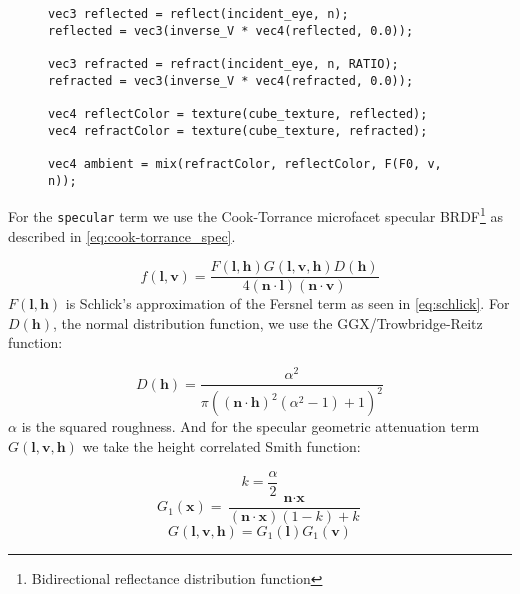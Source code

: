 \begin{figure}[ht!]
\begin{lstlisting}
vec3 reflected = reflect(incident_eye, n);
reflected = vec3(inverse_V * vec4(reflected, 0.0));

vec3 refracted = refract(incident_eye, n, RATIO);
refracted = vec3(inverse_V * vec4(refracted, 0.0));

vec4 reflectColor = texture(cube_texture, reflected);
vec4 refractColor = texture(cube_texture, refracted);

vec4 ambient = mix(refractColor, reflectColor, F(F0, v, n));
\end{lstlisting}
\end{figure}

For the \texttt{specular} term we use the Cook-Torrance microfacet specular
BRDF\footnote{Bidirectional reflectance distribution function} as
described in \autoref{eq:cook-torrance_spec}.

\begin{equation}\label{eq:cook-torrance_spec}
    f(\textbf{l}, \textbf{v}) ={} \frac{F(\textbf{l}, \textbf{h})
        G(\textbf{l}, \textbf{v}, \textbf{h}) D(\textbf{h})}{4
    (\textbf{n} \cdot \textbf{l}) (\textbf{n} \cdot \textbf{v})}
\end{equation}
%
$F(\textbf{l}, \textbf{h})$ is Schlick's approximation of the Fersnel term as
seen in \autoref{eq:schlick}. For $D(\textbf{h})$, the normal distribution
function, we use the GGX/Trowbridge-Reitz function:

\begin{equation}\label{eq:ndf_ggx}
    D(\textbf{h}) ={} \frac{\alpha^2}{\pi{({(\textbf{n} \cdot \textbf{h})}^2
    (\alpha^2 - 1) + 1)}^2}
\end{equation}
%
$\alpha$ is the squared roughness. And for the specular geometric attenuation
term $G(\textbf{l}, \textbf{v}, \textbf{h})$ we take the height correlated Smith
function:

\begin{equation}\label{eq:height_smith_a}
    k ={} \frac{\alpha}{2}
\end{equation}
\begin{equation}\label{eq:height_smith_b}
    G_1(\textbf{x}) ={} \frac{\textbf{n} \cdot \textbf{x}}{(\textbf{n} \cdot
    \textbf{x})(1 - k) + k}
\end{equation}
\begin{equation}\label{eq:height_smith_c}
    G(\textbf{l}, \textbf{v}, \textbf{h}) ={} G_1(\textbf{l}) G_1(\textbf{v})
\end{equation}

